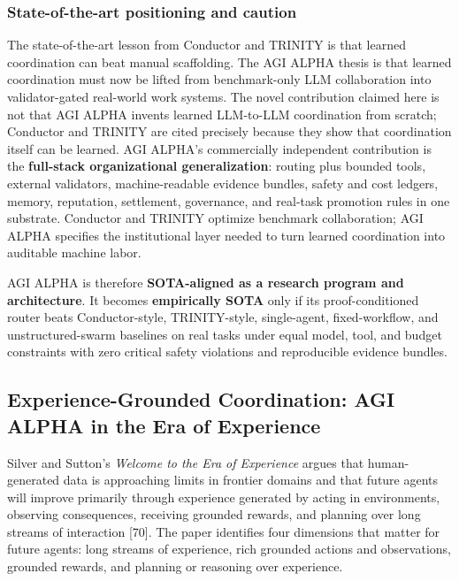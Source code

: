 \documentclass[11pt]{article}
\begin{document}
\subsubsection{State-of-the-art positioning and
caution}\label{state-of-the-art-positioning-and-caution}

The state-of-the-art lesson from Conductor and TRINITY is that learned
coordination can beat manual scaffolding. The AGI ALPHA thesis is that
learned coordination must now be lifted from benchmark-only LLM
collaboration into validator-gated real-world work systems. The novel
contribution claimed here is not that AGI ALPHA invents learned
LLM-to-LLM coordination from scratch; Conductor and TRINITY are cited
precisely because they show that coordination itself can be learned. AGI
ALPHA's commercially independent contribution is the \textbf{full-stack
organizational generalization}: routing plus bounded tools, external
validators, machine-readable evidence bundles, safety and cost ledgers,
memory, reputation, settlement, governance, and real-task promotion rules
in one substrate. Conductor and TRINITY optimize benchmark
collaboration; AGI ALPHA specifies the institutional layer needed to turn
learned coordination into auditable machine labor.

AGI ALPHA is therefore \textbf{SOTA-aligned as a research program and
architecture}. It becomes \textbf{empirically SOTA} only if its
proof-conditioned router beats Conductor-style, TRINITY-style,
single-agent, fixed-workflow, and unstructured-swarm baselines on real
tasks under equal model, tool, and budget constraints with zero critical
safety violations and reproducible evidence bundles.

\subsection{Experience-Grounded Coordination: AGI ALPHA in the Era of
Experience}\label{experience-grounded-coordination-agi-alpha-in-the-era-of-experience}

Silver and Sutton's \emph{Welcome to the Era of Experience} argues that
human-generated data is approaching limits in frontier domains and that
future agents will improve primarily through experience generated by
acting in environments, observing consequences, receiving grounded
rewards, and planning over long streams of interaction {[}70{]}. The
paper identifies four dimensions that matter for future agents: long
streams of experience, rich grounded actions and observations, grounded
rewards, and planning or reasoning over experience.
\end{document}
